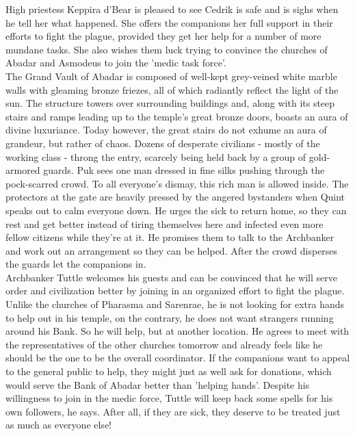 High priestess Keppira d'Bear is pleased to see Cedrik is safe and is sighs when he tell her what happened. She offers the companions her full support in their efforts to fight the plague, provided they get her help for a number of more mundane tasks. She also wishes them luck trying to convince the churches of Abadar and Asmodeus to join the 'medic task force'.\\

The Grand Vault of Abadar is composed of well-kept grey-veined white marble walls with gleaming bronze friezes, all of which radiantly reflect the light of the sun. The structure towers over surrounding buildings and, along with its steep stairs and ramps leading up to the temple's great bronze doors, boasts an aura of divine luxuriance. Today however, the great stairs do not exhume an aura of grandeur, but rather of chaos. Dozens of desperate civilians - mostly of the working class - throng the entry, scarcely being held back by a group of gold-armored guards. Puk sees one man dressed in fine silks pushing through the pock-scarred crowd. To all everyone's dismay, this rich man is allowed inside. The protectors at the gate are heavily pressed by the angered bystanders when Quint speaks out to calm everyone down. He urges the sick to return home, so they can rest and get better instead of tiring themselves here and infected even more fellow citizens while they're at it. He promises them to talk to the Archbanker and work out an arrangement so they can be helped. After the crowd disperses the guards let the companions in.\\

Archbanker Tuttle welcomes his guests and can be convinced that he will serve order and civilization better by joining in an organized effort to fight the plague. Unlike the churches of Pharasma and Sarenrae, he is not looking for extra hands to help out in his temple, on the contrary, he does not want strangers running around his Bank. So he will help, but at another location. He agrees to meet with the representatives of the other churches tomorrow and already feels like he should be the one to be the overall coordinator. If the companions want to appeal to the general public to help, they might just as well ask for donations, which would serve the Bank of Abadar better than 'helping hands'. Despite his willingness to join in the medic force, Tuttle will keep back some spells for his own followers, he says. After all, if they are sick, they deserve to be treated just as much as everyone else!\\


